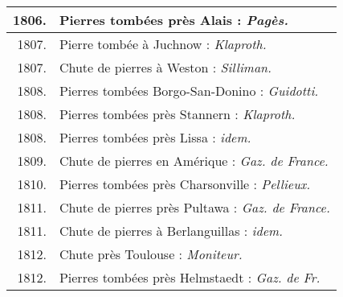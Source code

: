\documentclass[a4paper, 12pt, oneside, french]{article}
\begin{document}
\begin{center}
\begin{longtable}{r p{85mm}}
        1806. & Pierres tombées près Alais : \emph{Pagès.}   \\ \hline
        1807. & Pierre tombée à Juchnow : \emph{Klaproth.}   \\ \hline
        1807. & Chute de pierres à Weston : \emph{Silliman.}   \\ \hline
        1808. & Pierres tombées Borgo-San-Donino : \emph{Guidotti.}   \\ \hline
        1808. & Pierres tombées près Stannern : \emph{Klaproth.}   \\ \hline
        1808. & Pierres tombées près Lissa : \emph{idem.}   \\ \hline
        1809. & Chute de pierres en Amérique : \emph{Gaz. de France.}   \\ \hline
        1810. & Pierres tombées près Charsonville : \emph{Pellieux.}   \\ \hline
        1811. & Chute de pierres près Pultawa : \emph{Gaz. de France.}   \\ \hline
        1811. & Chute de pierres à Berlanguillas : \emph{idem.}   \\ \hline
        1812. & Chute près Toulouse : \emph{Moniteur.}   \\ \hline
        1812. & Pierres tombées près Helmstaedt : \emph{Gaz. de Fr.} \\ \hline
    \end{longtable}
\end{center}
\clearpage
\end{document}
